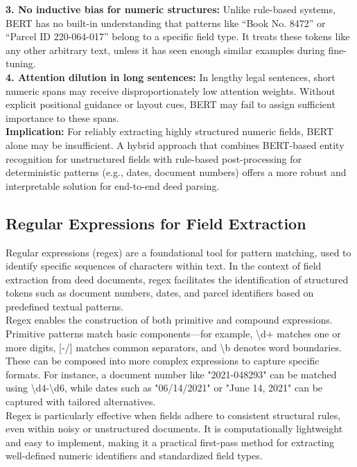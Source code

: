 \documentclass{article}
\begin{document}
\textbf{3. No inductive bias for numeric structures:} Unlike rule-based systems, BERT has no built-in understanding that patterns like ``Book No. 8472'' or ``Parcel ID 220-064-017'' belong to a specific field type. It treats these tokens like any other arbitrary text, unless it has seen enough similar examples during fine-tuning. \\

\textbf{4. Attention dilution in long sentences:} In lengthy legal sentences, short numeric spans may receive disproportionately low attention weights. Without explicit positional guidance or layout cues, BERT may fail to assign sufficient importance to these spans. \\

\textbf{Implication:} For reliably extracting highly structured numeric fields, BERT alone may be insufficient. A hybrid approach that combines BERT-based entity recognition for unstructured fields with rule-based post-processing for deterministic patterns (e.g., dates, document numbers) offers a more robust and interpretable solution for end-to-end deed parsing.

\subsection{Regular Expressions for Field Extraction}

Regular expressions (regex) are a foundational tool for pattern matching, used to identify specific sequences of characters within text. In the context of field extraction from deed documents, regex facilitates the identification of structured tokens such as document numbers, dates, and parcel identifiers based on predefined textual patterns. \\

Regex enables the construction of both primitive and compound expressions. Primitive patterns match basic components—for example, \textbackslash d+ matches one or more digits, [-/] matches common separators, and \textbackslash b denotes word boundaries. These can be composed into more complex expressions to capture specific formats. For instance, a document number like "2021-048293" can be matched using \textbackslash d{4}-\textbackslash d{6}, while dates such as "06/14/2021" or "June 14, 2021" can be captured with tailored alternatives. \\

Regex is particularly effective when fields adhere to consistent structural rules, even within noisy or unstructured documents. It is computationally lightweight and easy to implement, making it a practical first-pass method for extracting well-defined numeric identifiers and standardized field types. \\
\end{document}
